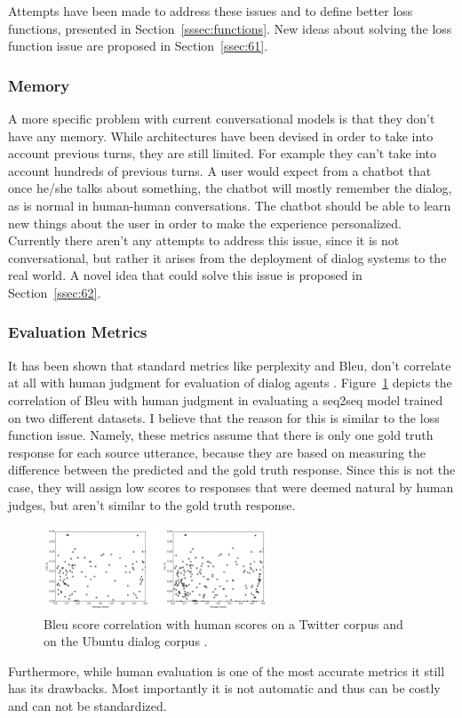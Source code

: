 \documentclass[12pt]{article}
\begin{document}
Attempts have been made to address these issues and to define better loss functions, presented in Section~\ref{sssec:functions}. New ideas about solving the loss function issue are proposed in Section~\ref{ssec:61}.

\subsubsection{Memory} \label{sssec:memory}
A more specific problem with current conversational models is that they don't have any memory. While architectures have been devised in order to take into account previous turns, they are still limited. For example they can't take into account hundreds of previous turns. A user would expect from a chatbot that once he/she talks about something, the chatbot will mostly remember the dialog, as is normal in human-human conversations. The chatbot should be able to learn new things about the user in order to make the experience personalized. Currently there aren't any attempts to address this issue, since it is not conversational, but rather it arises from the deployment of dialog systems to the real world. A novel idea that could solve this issue is proposed in Section~\ref{ssec:62}.

\subsubsection{Evaluation Metrics} \label{sssec:metrics}
It has been shown that standard metrics like perplexity and Bleu, don't correlate at all with human judgment for evaluation of dialog agents \cite{Tao:2017,Liu:2016}. Figure~\ref{fig:bleu} depicts the correlation of Bleu with human judgment in evaluating a seq2seq model trained on two different datasets. I believe that the reason for this is similar to the loss function issue. Namely, these metrics assume that there is only one gold truth response for each source utterance, because they are based on measuring the difference between the predicted and the gold truth response. Since this is not the case, they will assign low scores to responses that were deemed natural by human judges, but aren't similar to the gold truth response.
\begin{figure}[H]
	\centering
	\includegraphics[width=0.6\textwidth]{pics/bleu.png}
	\caption{Bleu score correlation with human scores \cite{Liu:2016} on a Twitter corpus and on the Ubuntu dialog corpus \cite{Lowe:2015}.}
	\label{fig:bleu}
\end{figure}
Furthermore, while human evaluation is one of the most accurate metrics it still has its drawbacks. Most importantly it is not automatic and thus can be costly and can not be standardized.
\end{document}
